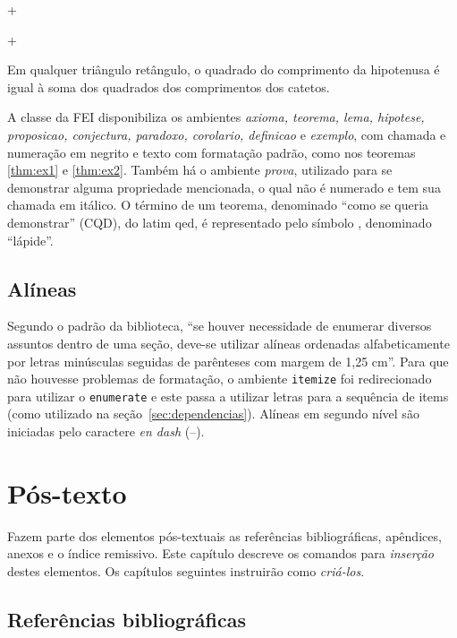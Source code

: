 \documentclass[xindy,rascunho]{fei}
\begin{document}
\latexinline+\begin{teorema}+

\begin{teorema} \label{thm:ex2}
Em qualquer triângulo retângulo, o quadrado do comprimento da hipotenusa é igual à soma dos quadrados dos comprimentos dos catetos.
\end{teorema}

A classe da FEI disponibiliza os ambientes \emph{axioma, teorema, lema, hipotese, proposicao, conjectura, paradoxo, corolario, definicao} e \emph{exemplo}, com chamada e numeração em negrito e texto com formatação padrão, como nos teoremas \ref{thm:ex1} e \ref{thm:ex2}. Também há o ambiente \emph{prova}, utilizado para se demonstrar alguma propriedade mencionada, o qual não é numerado e tem sua chamada em itálico. O término de um teorema, denominado ``como se queria demonstrar'' (CQD), do latim \gls{qed}, é representado pelo símbolo \qedsymbol, denominado ``lápide''.
	
	\subsection{Alíneas}
    
    Segundo o padrão da biblioteca, ``se houver necessidade de enumerar diversos assuntos dentro de uma seção, deve-se utilizar alíneas
ordenadas alfabeticamente por letras minúsculas seguidas de parênteses com margem de 1,25 cm''. Para que não houvesse problemas de formatação, o ambiente \texttt{itemize} foi redirecionado para utilizar o \texttt{enumerate} e este passa a utilizar letras para a sequência de items (como utilizado na seção~\ref{sec:dependencias}). Alíneas em segundo nível são iniciadas pelo caractere \emph{en dash} (--).

	\section{Pós-texto}\label{sec:postexto}
	
	Fazem parte dos elementos pós-textuais as referências bibliográficas, apêndices, anexos e o índice remissivo. Este capítulo descreve os comandos para \emph{inserção} destes elementos. Os capítulos seguintes instruirão como \emph{criá-los}.
	
	\subsection{Referências bibliográficas}
	

\end{teorema}
\end{document}
